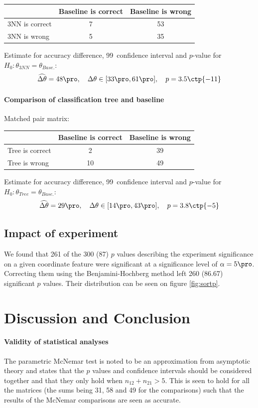 \documentclass[11pt,fleqn]{article}
\begin{document}
\begin{table}[H]
	\centering
	\begin{tabular}{l|c c}
		&Baseline is correct& Baseline is wrong \\
		\hline
		3NN is correct &7& 53\\
		3NN is wrong& 5& 35
	\end{tabular}
\end{table}\noindent 
Estimate for accuracy difference, 99\pro\ confidence interval and \(p\)-value for \(H_0: \theta_{3NN}=\theta_{Base.}\):
\[
\widehat{\Delta \theta} = 48\pro,\quad  \Delta \theta\in[33\pro , 61\pro], \quad p = 3.5\ctp{-11}
\]

\paragraph{Comparison of classification tree and baseline}
Matched pair matrix:

\begin{table}[H]
	\centering
	\begin{tabular}{l|c c}
		&Baseline is correct& Baseline is wrong \\
		\hline
		Tree is correct &2& 39\\
		Tree is wrong& 10& 49
	\end{tabular}
\end{table}\noindent 
Estimate for accuracy difference, 99\pro\ confidence interval and \(p\)-value for \(H_0: \theta_{Tree}=\theta_{Base.}\):
\[
\widehat{\Delta \theta} = 29\pro,\quad  \Delta \theta\in[14\pro , 43\pro], \quad p = 3.8\ctp{-5}
\]

\subsection{Impact of experiment}
We found that 261 of the 300 (87\pro) $ p $ values describing the experiment significance on a given coordinate feature were significant at a significance level of $ \alpha=5\pro $. Correcting them using the Benjamini-Hochberg method \cite{BH} left 260 (86.67\pro) significant $ p $ values. Their distribution can be seen on figure \ref{fig:sortp}.

\section{Discussion and Conclusion}
\paragraph{Validity of statistical analyses}
The parametric McNemar test is noted to be an approximation from asymptotic theory and \cite{Tue} states that the \(p\) values and confidence intervals should be considered together and that they only hold when \(n_{12}+n_{21}> 5\). This is seen to hold for all the matrices (the sums being 31, 58 and 49 for the comparisons) such that the results of the McNemar comparisons are seen as accurate.
\end{document}
